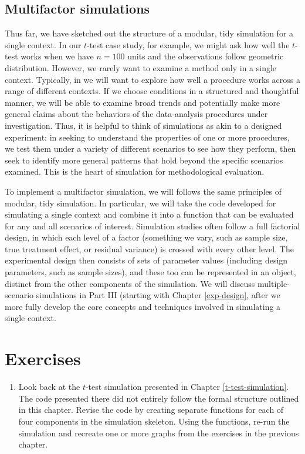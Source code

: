 \documentclass[
]{book}
\providecommand{\tightlist}{%
  \setlength{\itemsep}{0pt}\setlength{\parskip}{0pt}}
\begin{document}
\subsection{Multifactor simulations}\label{multifactor-simulations}

Thus far, we have sketched out the structure of a modular, tidy simulation for a single context.
In our \(t\)-test case study, for example, we might ask how well the \(t\)-test works when we have \(n=100\) units and the observations follow geometric distribution.
However, we rarely want to examine a method only in a single context.
Typically, in we will want to explore how well a procedure works across a range of different contexts.
If we choose conditions in a structured and thoughtful manner, we will be able to examine broad trends and potentially make more general claims about the behaviors of the data-analysis procedures under investigation.
Thus, it is helpful to think of simulations as akin to a designed experiment: in seeking to understand the properties of one or more procedures, we test them under a variety of different scenarios to see how they perform, then seek to identify more general patterns that hold beyond the specific scenarios examined.
This is the heart of simulation for methodological evaluation.

To implement a multifactor simulation, we will follows the same principles of modular, tidy simulation.
In particular, we will take the code developed for simulating a single context and combine it into a function that can be evaluated for any and all scenarios of interest.
Simulation studies often follow a full factorial design, in which each level of a factor (something we vary, such as sample size, true treatment effect, or residual variance) is crossed with every other level.
The experimental design then consists of sets of parameter values (including design parameters, such as sample sizes), and these too can be represented in an object, distinct from the other components of the simulation.
We will discuss multiple-scenario simulations in Part III (starting with Chapter \ref{exp-design}, after we more fully develop the core concepts and techniques involved in simulating a single context.

\section{Exercises}\label{exercises-1}

\begin{enumerate}
\def\labelenumi{\arabic{enumi}.}
\tightlist
\item
  Look back at the \(t\)-test simulation presented in Chapter \ref{t-test-simulation}. The code presented there did not entirely follow the formal structure outlined in this chapter. Revise the code by creating separate functions for each of four components in the simulation skeleton. Using the functions, re-run the simulation and recreate one or more graphs from the exercises in the previous chapter.
\end{enumerate}
\end{document}
